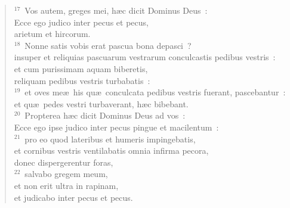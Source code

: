 \begin{flushleft}
\begin{verse}
${}^{17}$~Vos autem, greges mei, h\ae c dicit Dominus Deus~:\\ Ecce ego judico inter pecus et pecus,\\ arietum et hircorum.\\
${}^{18}$~Nonne satis vobis erat pascua bona depasci~?\\ insuper et reliquias pascuarum vestrarum conculcastis pedibus vestris~:\\ et cum purissimam aquam biberetis,\\ reliquam pedibus vestris turbabatis~:\\
${}^{19}$~et oves me\ae\ his qu\ae\ conculcata pedibus vestris fuerant, pascebantur~:\\ et qu\ae\ pedes vestri turbaverant, h\ae c bibebant.\\
${}^{20}$~Propterea h\ae c dicit Dominus Deus ad vos~:\\ Ecce ego ipse judico inter pecus pingue et macilentum~:\\
${}^{21}$~pro eo quod lateribus et humeris impingebatis,\\ et cornibus vestris ventilabatis omnia infirma pecora,\\ donec dispergerentur foras,\\
${}^{22}$~salvabo gregem meum,\\ et non erit ultra in rapinam,\\ et judicabo inter pecus et pecus.\end{verse}\end{flushleft}


